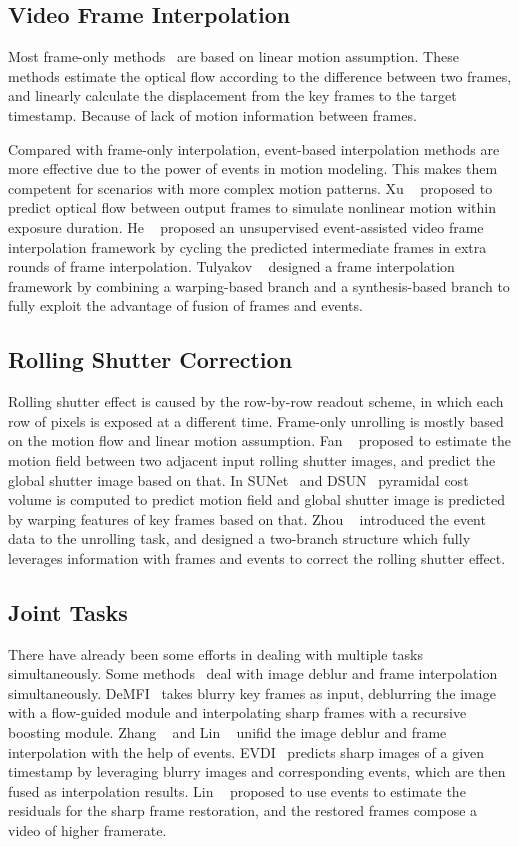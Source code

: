 \documentclass[10pt,twocolumn,letterpaper]{article}
\begin{document}
\subsection{Video Frame Interpolation}
Most frame-only methods~\cite{SloMo,AdaCoF,DAIN,RIFE} are based on linear motion assumption. These methods estimate the optical flow according to the difference between two frames, and linearly calculate the displacement from the key frames to the target timestamp.  Because of lack of motion information between frames.

Compared with frame-only interpolation, event-based interpolation methods are more effective due to the power of events in motion modeling. This makes them competent for scenarios with more complex motion patterns. 
Xu \etal~\cite{REDNet} proposed to predict optical flow between output frames to simulate nonlinear motion within exposure duration. 
He \etal~\cite{timereplay} proposed an unsupervised event-assisted video frame interpolation framework by cycling the predicted intermediate frames in extra rounds of frame interpolation.
Tulyakov \etal~\cite{TimeLens} designed a frame interpolation framework by combining a warping-based branch and a synthesis-based branch to fully exploit the advantage of fusion of frames and events. 

\subsection{Rolling Shutter Correction}
Rolling shutter effect is caused by the row-by-row readout scheme, in which each row of pixels is exposed at a different time. 
Frame-only unrolling is mostly based on the motion flow and linear motion assumption. 
Fan \etal~\cite{RSSR,CVR} proposed to estimate the motion field between two adjacent input rolling shutter images, and predict the global shutter image based on that. 
In SUNet~\cite{SUNet} and DSUN~\cite{DSUN} pyramidal cost volume is computed to predict motion field and global shutter image is predicted by warping features of key frames based on that.
Zhou \etal~\cite{EvUnroll} introduced the event data to the unrolling task, and designed a two-branch structure which fully leverages information with frames and events to correct the rolling shutter effect.

\subsection{Joint Tasks}
There have already been some efforts in dealing with multiple tasks simultaneously. 
Some methods~\cite{EVDI, LEDVDI, DeMFI} deal with image deblur and frame interpolation simultaneously.
DeMFI~\cite{DeMFI} takes blurry key frames as input, deblurring the image with a flow-guided module and interpolating sharp frames with a recursive boosting module. 
Zhang \etal~\cite{EVDI} and Lin \etal~\cite{LEDVDI} unifid the image deblur and frame interpolation with the help of events. 
EVDI~\cite{EVDI}  predicts sharp images of a given timestamp by leveraging blurry images and corresponding events, which are then fused as interpolation results. 
Lin \etal~\cite{LEDVDI} proposed to use events to estimate the residuals for the sharp frame restoration, and the restored frames compose a video of higher framerate.
\end{document}
